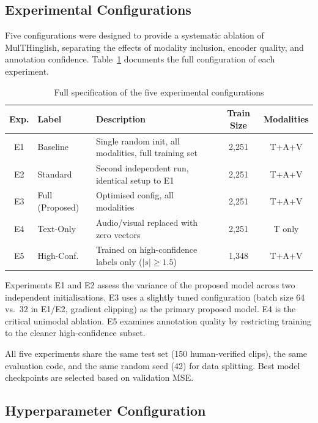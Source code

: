 \subsection{Experimental Configurations}

Five configurations were designed to provide a systematic ablation of MulTHinglish, separating the effects of modality inclusion, encoder quality, and annotation confidence. Table~\ref{tab:exp_config} documents the full configuration of each experiment.

\begin{table}[ht]
\centering
\caption{Full specification of the five experimental configurations}
\label{tab:exp_config}
\renewcommand{\arraystretch}{1.3}
\begin{tabular}{clp{5.5cm}cc}
\toprule
\textbf{Exp.} & \textbf{Label} & \textbf{Description} & \textbf{Train Size} & \textbf{Modalities} \\
\midrule
E1 & Baseline     & Single random init, all modalities, full training set & 2,251 & T+A+V \\
E2 & Standard     & Second independent run, identical setup to E1         & 2,251 & T+A+V \\
E3 & Full (Proposed) & Optimised config, all modalities                   & 2,251 & T+A+V \\
E4 & Text-Only    & Audio/visual replaced with zero vectors               & 2,251 & T only \\
E5 & High-Conf.   & Trained on high-confidence labels only ($|s|\geq1.5$)& 1,348 & T+A+V \\
\bottomrule
\end{tabular}
\end{table}

Experiments E1 and E2 assess the variance of the proposed model across two independent initialisations. E3 uses a slightly tuned configuration (batch size 64 vs.\ 32 in E1/E2, gradient clipping) as the primary proposed model. E4 is the critical unimodal ablation. E5 examines annotation quality by restricting training to the cleaner high-confidence subset.

All five experiments share the same test set (150 human-verified clips), the same evaluation code, and the same random seed (42) for data splitting. Best model checkpoints are selected based on validation MSE.

\subsection{Hyperparameter Configuration}

